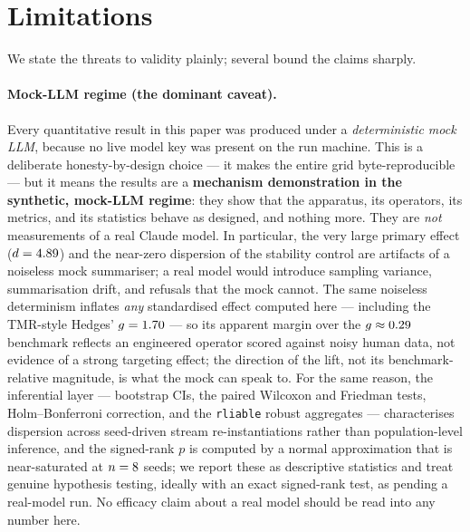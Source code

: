 \section{Limitations}\label{sec:limitations}

We state the threats to validity plainly; several bound the claims sharply.

\paragraph{Mock-LLM regime (the dominant caveat).} Every quantitative result in
this paper was produced under a \emph{deterministic mock LLM}, because no live
model key was present on the run machine. This is a deliberate honesty-by-design
choice --- it makes the entire grid byte-reproducible --- but it means the
results are a \textbf{mechanism demonstration in the synthetic, mock-LLM regime}:
they show that the apparatus, its operators, its metrics, and its statistics
behave as designed, and nothing more. They are \emph{not} measurements of a real
Claude model. In particular, the very large primary effect ($d=4.89$) and
the near-zero dispersion of the stability control are artifacts of a noiseless
mock summariser; a real model would introduce sampling variance, summarisation
drift, and refusals that the mock cannot. The same noiseless determinism inflates
\emph{any} standardised effect computed here --- including the TMR-style Hedges'
$g=1.70$ --- so its apparent margin over the $g\approx0.29$ benchmark
reflects an engineered operator scored against noisy human data, not evidence of a
strong targeting effect; the direction of the lift, not its benchmark-relative
magnitude, is what the mock can speak to. For the same reason, the inferential
layer --- bootstrap CIs, the paired Wilcoxon and Friedman tests, Holm--Bonferroni
correction, and the \texttt{rliable} robust aggregates --- characterises dispersion
across seed-driven stream re-instantiations rather than population-level inference,
and the signed-rank $p$ is computed by a normal approximation that is
near-saturated at $n=8$ seeds; we report these as descriptive statistics
and treat genuine hypothesis testing, ideally with an exact signed-rank test, as
pending a real-model run. No efficacy claim about a real model should be read into
any number here.

